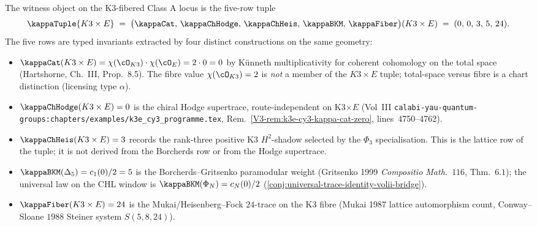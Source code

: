 \begin{remark}%
%
%
The witness object on the K3-fibered Class A locus is the
five-row tuple
\[
 \kappaTuple{K3 \times E}
 \;=\;
 \bigl(\kappaCat,\, \kappaChHodge,\, \kappaChHeis,\, \kappaBKM,\, \kappaFiber\bigr)(K3 \times E)
 \;=\;
 (0,\, 0,\, 3,\, 5,\, 24).
\]
The five rows are typed invariants extracted by four distinct
constructions on the same geometry:
\begin{itemize}
\item $\kappaCat(K3 \times E) = \chi(\cO_{K3}) \cdot \chi(\cO_E)
 = 2 \cdot 0 = 0$ by K\"unneth multiplicativity for coherent
 cohomology on the total space (Hartshorne, Ch.~III, Prop.~8.5).
 The fibre value $\chi(\cO_{K3}) = 2$ is \emph{not} a member of
 the $K3 \times E$ tuple; total-space versus fibre is a chart
 distinction (licensing type $\alpha$).
\item $\kappaChHodge(K3 \times E) = 0$ is the chiral Hodge
 supertrace, route-independent on K3$\times E$
 (Vol~III \texttt{calabi-yau-quantum-groups:chapters/examples/k3e\_cy3\_programme.tex},
 Rem.~\ref*{V3-rem:k3e-cy3-kappa-cat-zero}, lines~4750--4762).
\item $\kappaChHeis(K3 \times E) = 3$ records the rank-three positive
 K3 \(H^{2}\)-shadow selected by the $\Phi_3$ specialisation. This is
 the lattice row of the tuple; it is not derived from the Borcherds
 row or from the Hodge supertrace.
\item $\kappaBKM(\Delta_5) = c_1(0)/2 = 5$ is the
 Borcherds--Gritsenko paramodular weight (Gritsenko 1999
 \emph{Compositio Math.}~$116$, Thm.~$6.1$); the universal law on
 the CHL window is $\kappaBKM(\Phi_N) = c_N(0)/2$
 (\cref{conj:universal-trace-identity-volii-bridge}).
\item $\kappaFiber(K3 \times E) = 24$ is the
 Mukai/Heisenberg--Fock $24$-trace on the K3 fibre (Mukai 1987
 lattice automorphism count, Conway--Sloane $1988$ Steiner system
 $S(5, 8, 24)$).
\end{itemize}


\end{remark}
